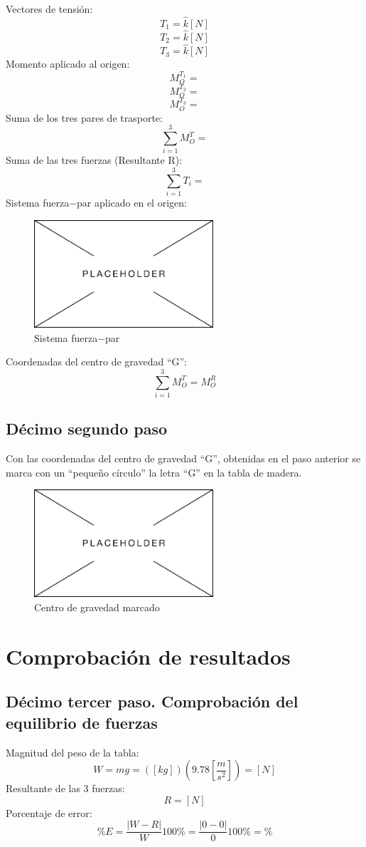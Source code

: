 \documentclass[12pt, titlepage]{report}
\begin{document}
    \newpage
    Vectores de tensión:
    $$T_{1} =  \hat{k} [N]$$
    $$T_{2} =  \hat{k} [N]$$
    $$T_{3} =  \hat{k} [N]$$
    Momento aplicado al origen:
    $$M^{T_{1}}_{O} = $$
    $$M^{T_{2}}_{O} = $$
    $$M^{T_{3}}_{O} = $$
    Suma de los tres pares de trasporte:
    $$\sum_{i = 1}^{3} M^T_{O} =$$
    Suma de las tres fuerzas (Resultante R):
    $$\sum_{i = 1}^{3} T_{i} =$$
    Sistema fuerza$-$par aplicado en el origen:

    \begin{figure}[ht]
        \centering
        \includegraphics[height=4cm]{Placeholder.png}
        \caption{Sistema fuerza$-$par}
    \end{figure}
    Coordenadas del centro de gravedad ``G'':
    $$\sum_{i=1}^{3} M^T_{O} = M^R_{O}$$

    \subsection*{Décimo segundo paso}
    Con las coordenadas del centro de gravedad ``G'', obtenidas en el paso anterior se marca con un ``pequeño círculo'' la letra ``G'' en la tabla de madera.

    \begin{figure}[ht]
        \centering
        \includegraphics[height=4cm]{Placeholder.png}
        \caption{Centro de gravedad marcado}
    \end{figure}

    \hfill
    \section{Comprobación de resultados}
    \subsection*{Décimo tercer paso. Comprobación del equilibrio de fuerzas}
    Magnitud del peso de la tabla: 
    $$W=mg=( [kg])(9.78 [\frac{m}{s^2}]) = [N]$$
    Resultante de las 3 fuerzas: 
    $$R = [N]$$
    Porcentaje de error: 
    $$\%E=\frac{|W-R|}{W}100\%=\frac{|0-0|}{0}100\% = \%$$
\end{document}

